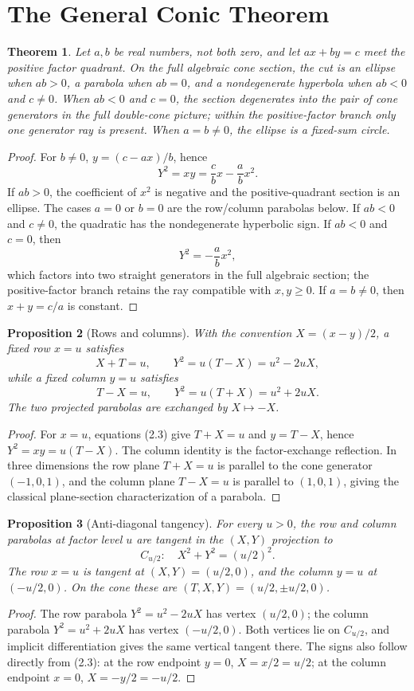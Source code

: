 \documentclass[11pt]{amsart}
\newtheorem{theorem}{Theorem}[section]
\newtheorem{proposition}[theorem]{Proposition}
\theoremstyle{remark}
\begin{document}
\section{The General Conic Theorem}
\begin{theorem}\label{thm:conic}
Let $a,b$ be real numbers, not both zero, and let $ax+by=c$ meet the positive factor quadrant. On the full algebraic cone section, the cut is an ellipse when $ab>0$, a parabola when $ab=0$, and a nondegenerate hyperbola when $ab<0$ and $c\ne0$. When $ab<0$ and $c=0$, the section degenerates into the pair of cone generators in the full double-cone picture; within the positive-factor branch only one generator ray is present. When $a=b\ne0$, the ellipse is a fixed-sum circle.
\end{theorem}
\begin{proof}
For $b\ne0$, $y=(c-ax)/b$, hence
\[
Y^2=xy=\frac cbx-\frac abx^2.
\]
If $ab>0$, the coefficient of $x^2$ is negative and the positive-quadrant section is an ellipse. The cases $a=0$ or $b=0$ are the row/column parabolas below. If $ab<0$ and $c\ne0$, the quadratic has the nondegenerate hyperbolic sign. If $ab<0$ and $c=0$, then
\[
Y^2=-\frac abx^2,
\]
which factors into two straight generators in the full algebraic section; the positive-factor branch retains the ray compatible with $x,y\ge0$. If $a=b\ne0$, then $x+y=c/a$ is constant.
\end{proof}

\begin{proposition}[Rows and columns]\label{prop:rows}
With the convention $X=(x-y)/2$, a fixed row $x=u$ satisfies
\[
X+T=u,\qquad Y^2=u(T-X)=u^2-2uX,
\]
while a fixed column $y=u$ satisfies
\[
T-X=u,\qquad Y^2=u(T+X)=u^2+2uX.
\]
The two projected parabolas are exchanged by $X\mapsto-X$.
\end{proposition}

\begin{proof}
For $x=u$, equations (2.3) give $T+X=u$ and $y=T-X$, hence $Y^2=xy=u(T-X)$. The column identity is the factor-exchange reflection. In three dimensions the row plane $T+X=u$ is parallel to the cone generator $(-1,0,1)$, and the column plane $T-X=u$ is parallel to $(1,0,1)$, giving the classical plane-section characterization of a parabola.
\end{proof}

\begin{proposition}[Anti-diagonal tangency]\label{prop:tangent}
For every $u>0$, the row and column parabolas at factor level $u$ are tangent in the $(X,Y)$ projection to
\[
C_{u/2}:\quad X^2+Y^2=(u/2)^2.
\]
The row $x=u$ is tangent at $(X,Y)=(u/2,0)$, and the column $y=u$ at $(-u/2,0)$. On the cone these are $(T,X,Y)=(u/2,\pm u/2,0)$.
\end{proposition}
\begin{proof}
The row parabola $Y^2=u^2-2uX$ has vertex $(u/2,0)$; the column parabola $Y^2=u^2+2uX$ has vertex $(-u/2,0)$. Both vertices lie on $C_{u/2}$, and implicit differentiation gives the same vertical tangent there. The signs also follow directly from (2.3): at the row endpoint $y=0$, $X=x/2=u/2$; at the column endpoint $x=0$, $X=-y/2=-u/2$.
\end{proof}
\end{document}
